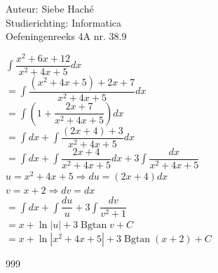 \documentclass[a4paper]{article}
\newcommand{\Bgtan}{\operatorname{Bgtan}}
\begin{document}
\noindent \large Auteur: Siebe Haché \\
\noindent \large Studierichting: Informatica\\
\noindent \large Oefeningenreeks 4A nr. 38.9\\

\medskip
\normalsize

$\displaystyle\int \dfrac{x^2 + 6x + 12}{x^2 + 4x + 5} dx$\\

$= \displaystyle\int \dfrac{(x^2 + 4x + 5) + 2x + 7}{x^2 + 4x + 5} dx$\\

$= \displaystyle\int \left( 1 + \dfrac{2x + 7}{x^2 + 4x + 5} \right) dx$\\

$= \displaystyle\int dx + \displaystyle\int \dfrac{(2x + 4) + 3}{x^2 + 4x + 5} dx$\\

$= \displaystyle\int dx + \displaystyle\int \dfrac{2x + 4}{x^2 + 4x + 5} dx + 3 \displaystyle\int \dfrac{dx}{x^2 + 4x + 5}$\\

$u =x^2 + 4x + 5 \Rightarrow du = (2x + 4) dx$\\

$v = x + 2 \Rightarrow dv = dx$\\

$= \displaystyle\int dx + \displaystyle\int \dfrac{du}{u} + 3 \displaystyle\int \dfrac{dv}{v^2 + 1}$\\

$= x + \ln |u| + 3 \Bgtan v + C$\\

$= x + \ln |x^2 + 4x + 5| + 3 \Bgtan (x + 2) + C$\\

\begin{thebibliography}{999}
\end{thebibliography}
\end{document}
